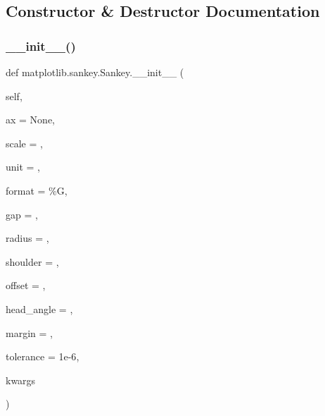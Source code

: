 \subsection{Constructor \& Destructor Documentation}
\mbox{\label{classmatplotlib_1_1sankey_1_1Sankey_ab445906edf68a057b3f170b449614a94}} 
\subsubsection{\texorpdfstring{\+\_\+\+\_\+init\+\_\+\+\_\+()}{\_\_init\_\_()}}
{\footnotesize\ttfamily def matplotlib.\+sankey.\+Sankey.\+\_\+\+\_\+init\+\_\+\+\_\+ (\begin{DoxyParamCaption}\item[{}]{self,  }\item[{}]{ax = {\ttfamily None},  }\item[{}]{scale = {},  }\item[{}]{unit = {\ttfamily \textquotesingle{}\textquotesingle{}},  }\item[{}]{format = {\ttfamily \textquotesingle{}\%G\textquotesingle{}},  }\item[{}]{gap = {},  }\item[{}]{radius = {},  }\item[{}]{shoulder = {},  }\item[{}]{offset = {},  }\item[{}]{head\+\_\+angle = {},  }\item[{}]{margin = {},  }\item[{}]{tolerance = {\ttfamily 1e-\/6},  }\item[{}]{kwargs }\end{DoxyParamCaption})}

